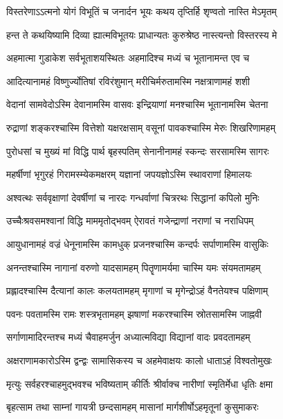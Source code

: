 \twolineshloka
{विस्तरेणाऽऽत्मनो योगं विभूतिं च जनार्दन}
{भूयः कथय तृप्तिर्हि शृण्वतो नास्ति मेऽमृतम्}%

\twolineshloka
{हन्त ते कथयिष्यामि दिव्या ह्यात्मविभूतयः}
{प्राधान्यतः कुरुश्रेष्ठ नास्त्यन्तो विस्तरस्य मे}%

\twolineshloka
{अहमात्मा गुडाकेश सर्वभूताशयस्थितः}
{अहमादिश्च मध्यं च भूतानामन्त एव च}%

\twolineshloka
{आदित्यानामहं विष्णुर्ज्योतिषां रविरंशुमान्}
{मरीचिर्मरुतामस्मि नक्षत्राणामहं शशी}%

\twolineshloka
{वेदानां सामवेदोऽस्मि देवानामस्मि वासवः}
{इन्द्रियाणां मनश्चास्मि भूतानामस्मि चेतना}%

\twolineshloka
{रुद्राणां शङ्करश्चास्मि वित्तेशो यक्षरक्षसाम्}
{वसूनां पावकश्चास्मि मेरुः शिखरिणामहम्}%

\twolineshloka
{पुरोधसां च मुख्यं मां विद्धि पार्थ बृहस्पतिम्}
{सेनानीनामहं स्कन्दः सरसामस्मि सागरः}%

\twolineshloka
{महर्षीणां भृगुरहं गिरामस्म्येकमक्षरम्}
{यज्ञानां जपयज्ञोऽस्मि स्थावराणां हिमालयः}%

\twolineshloka
{अश्वत्थः सर्ववृक्षाणां देवर्षीणां च नारदः}
{गन्धर्वाणां चित्ररथः सिद्धानां कपिलो मुनिः}%

\twolineshloka
{उच्चैःश्रवसमश्वानां विद्धि माममृतोद्भवम्}
{ऐरावतं गजेन्द्राणां नराणां च नराधिपम्}%

\twolineshloka
{आयुधानामहं वज्रं धेनूनामस्मि कामधुक्}
{प्रजनश्चास्मि कन्दर्पः सर्पाणामस्मि वासुकिः}%

\twolineshloka
{अनन्तश्चास्मि नागानां वरुणो यादसामहम्}
{पितॄणामर्यमा चास्मि यमः संयमतामहम्}%

\twolineshloka
{प्रह्लादश्चास्मि दैत्यानां कालः कलयतामहम्}
{मृगाणां च मृगेन्द्रोऽहं वैनतेयश्च पक्षिणाम्}%

\twolineshloka
{पवनः पवतामस्मि रामः शस्त्रभृतामहम्}
{झषाणां मकरश्चास्मि स्रोतसामस्मि जाह्नवी}%

\twolineshloka
{सर्गाणामादिरन्तश्च मध्यं चैवाहमर्जुन}
{अध्यात्मविद्या विद्यानां वादः प्रवदतामहम्}%

\twolineshloka
{अक्षराणामकारोऽस्मि द्वन्द्वः सामासिकस्य च}
{अहमेवाक्षयः कालो धाताऽहं विश्वतोमुखः}%

\twolineshloka
{मृत्युः सर्वहरश्चाहमुद्भवश्च भविष्यताम्}
{कीर्तिः श्रीर्वाक्च नारीणां स्मृतिर्मेधा धृतिः क्षमा}%

\twolineshloka
{बृहत्साम तथा साम्नां गायत्री छन्दसामहम्}
{मासानां मार्गशीर्षोऽहमृतूनां कुसुमाकरः}%

